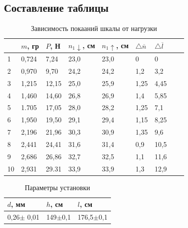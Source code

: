 \documentclass[a4paper]{article}
\begin{document}
\subsection{Составление таблицы}

\begin{table}[!h]
    \begin{center}
    \begin{tabular}{|l|l|l|l|l|l|l|l|l|}
    \hline
    & $m$, гр & $P$, Н & $n_1 \downarrow$, см & $n_1\uparrow$, см &$\bigtriangleup \overline{n} $ &$\bigtriangleup \overline{l} $  \\ \hline
    1                       & 0,724&        7,24&      23,0&   23,0 &   0&   0        \\ \hline
    2                       & 0,970&        9,70&      24,2&   24,2&   1,2&   3,2       \\ \hline
    3                        & 1,215&       12,15&     25,0&   25,9&   1,25&  4,45   \\ \hline
    4                        & 1,460&       14,60&     26,8&   26,9&   1,4&   5,85        \\ \hline
    5                        & 1.705&       17,05&     28,0&   28,2&   1,25&  7,1     \\ \hline
    6                        & 1,950&       19,50&     29,1&   29,4&   1,15&  8,25         \\ \hline
    7                        & 2,196&       21,96&     30,3&   30,9&   1,35&  9,6        \\ \hline
    8                        & 2,441&       24,41&     31,6&   31,4&   0,9&   10,5     \\ \hline
    9                        & 2,686&       26,86&     32,7&   32,5&   1,1&   11,6      \\ \hline
    10                        & 2,931&      29.31&     33,9&   33,9&   1,3&   12,9     \\ \hline

    \end{tabular}
    \caption{Зависимость покааний шкалы от нагрузки}
    \end{center}
    \end{table}

\begin{table}[!h]
    \begin{center}
    \begin{tabular}{|l|l|l|}
    \hline
        $d$, мм&  $h$, см& $l$, см \\ \hline
        0,26$\pm $ 0,01& 149$\pm $0,1&176,5$\pm $0,1  \\ \hline
    \end{tabular}
    \caption{Параметры установки}
    \end{center}
\end{table}
\end{document}
